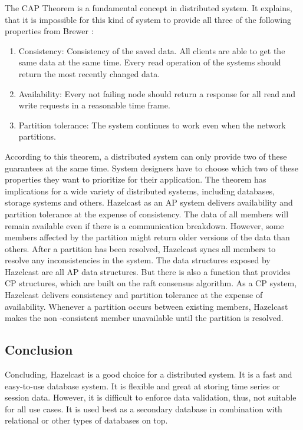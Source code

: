 The CAP Theorem is a fundamental concept in distributed system. It explains, that it is impossible for 
this kind of system to provide all three of the following properties from Brewer \parencite[S.~23]{Brewer.2012}:
\begin{enumerate}
    \item Consistency: Consistency of the saved data. All clients are able to get the same data at the same time. Every read operation of the systems should return the most recently changed data.
    \item Availability: Every not failing node should return a response for all read and write requests in a reasonable time frame.
    \item Partition tolerance: The system continues to work even when the network partitions.
\end{enumerate}

\noindent
According to this theorem, a distributed system can only provide two of these guarantees at the same 
time. System designers have to choose which two of these properties they want to prioritize for their 
application. The theorem has implications for a wide variety of distributed systems, including databases, 
storage systems and others. \parencite[S.~1]{Brewer.2017}
Hazelcast as an AP system delivers availability and partition tolerance at the expense of consistency. 
The data of all members will remain available even if there is a communication breakdown. 
However, some members affected by the partition might return older versions of the data than others. 
After a partition has been resolved, Hazelcast syncs all members to resolve any inconsistencies in the 
system. The data structures exposed by Hazelcast are all AP data structures. 
But there is also a function  that provides CP structures, which are built on the raft consensus algorithm. 
As a CP system, Hazelcast  delivers consistency and partition tolerance at the expense of availability. 
Whenever a partition occurs between existing members, Hazelcast makes the non -consistent member 
unavailable until the partition is resolved. \parencite{Hazelcast.05.04.2023}

\subsection{Conclusion} \label{subsec:conclusionHazelcast}

Concluding, Hazelcast is a good choice for a distributed system. It is a fast and easy-to-use database system.
It is flexible and great at storing time series or session data. However, it is difficult to enforce data validation, thus, 
not suitable for all use cases. It is used best as a secondary database in combination with relational or other types of databases on top.

